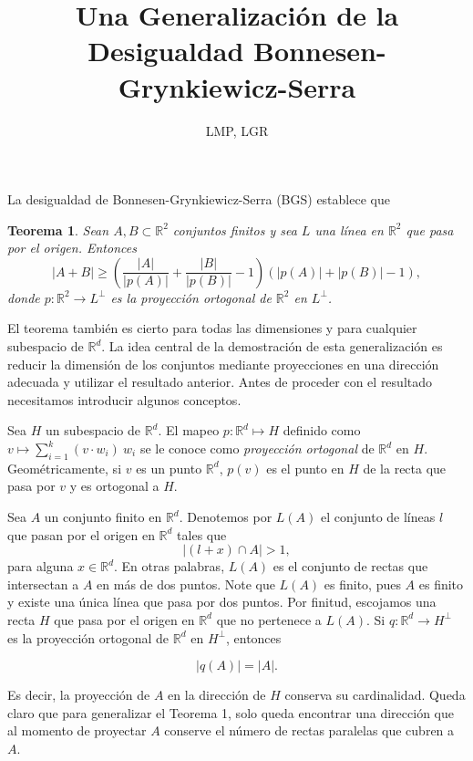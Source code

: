 \documentclass[12pt]{article}
\title{Una Generalización de la Desigualdad Bonnesen-Grynkiewicz-Serra}
\author{LMP, LGR}
\newcommand{\R}{\mathbb{R}}
\newtheorem{theorem}{Teorema}
\begin{document}
\maketitle


La desigualdad de Bonnesen-Grynkiewicz-Serra (BGS) establece que %

\begin{theorem} \label{GS}
Sean $A, B \subset \R^2$ conjuntos finitos y sea $L$ una línea en $\R^2$ que pasa por el origen. Entonces
$$\lvert A + B \rvert \geq \left( \frac{\lvert A \rvert }{\lvert p (A) \rvert} + \frac{\lvert B \rvert }{\lvert p (B) \rvert } - 1\right) \left( \lvert p(A) \rvert + \lvert p(B) \rvert - 1 \right),$$
donde $p: \R^2 \rightarrow L^\perp$ es la proyección ortogonal de $\R^2$ en $L^\perp$.
\end{theorem}

El teorema también es cierto para todas las dimensiones y para cualquier subespacio de $\R^d$. La idea central de la demostración de esta generalización es reducir la dimensión de los conjuntos mediante proyecciones en una dirección adecuada y utilizar el resultado anterior. Antes de proceder con el resultado necesitamos introducir algunos conceptos.

Sea $H$ un subespacio de $\R^d$. El mapeo $p: \R^d \mapsto H$ definido como $v \mapsto \sum_{i=1}^k (v \cdot w_i) \ w_i$  se le conoce como \textit{proyección ortogonal} de $\R^d$ en $H$. Geométricamente, si $v$ es un punto $\R^d$, $p(v)$ es el punto en $H$ de la recta que pasa por $v$ y es ortogonal a $H.$  

Sea $A$ un conjunto finito en $\R^d$. Denotemos por $L(A)$ el conjunto de líneas $l$ que pasan por el origen en $\R^d$ tales que 
$$\lvert (l + x) \cap A \rvert > 1,$$
para alguna $x \in \R^d$. En otras palabras, $L(A)$ es el conjunto de rectas que intersectan a $A$ en más de dos puntos. Note que $L(A)$ es finito, pues $A$ es finito y existe una única línea que pasa por dos puntos. Por finitud, escojamos una recta $H$ que pasa por el origen en $\R^d$ que no pertenece a $L(A)$. Si $q: \R^d \rightarrow H^\perp$ es la proyección ortogonal de $\R^d$ en $H^\perp$, entonces

$$\lvert q(A) \rvert = \lvert A \rvert.$$

Es decir, la proyección de $A$ en la dirección de $H$ conserva su cardinalidad. Queda claro que para generalizar el Teorema 1, solo queda encontrar una dirección que al momento de proyectar $A$ conserve el número de rectas paralelas que cubren a $A$.
\end{document}
